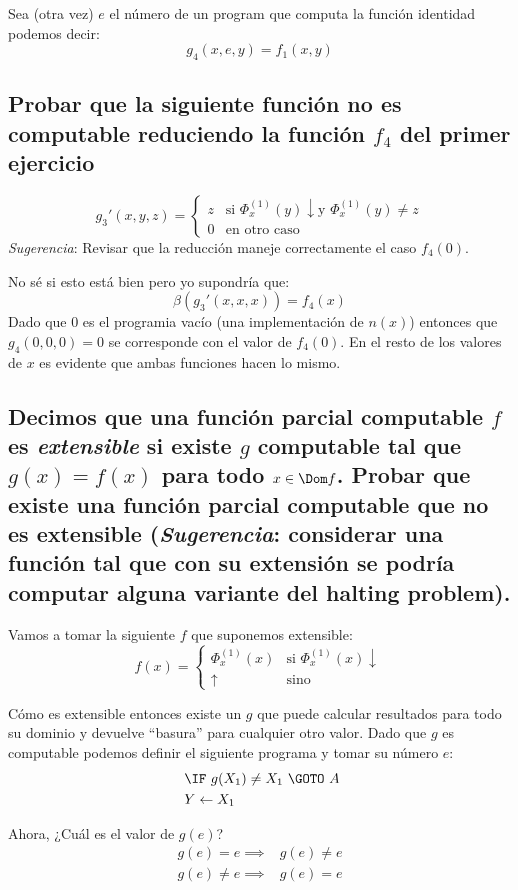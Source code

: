 \documentclass[fleqn, 11pt]{article}
\newcommand{\indef}{\uparrow}
\newcommand{\ddef}{\downarrow}
\newcommand{\into}{\leftarrow}
\begin{document}
Sea (otra vez) $e$ el número de un program que computa la función identidad
podemos decir:
\[
	g_4(x, e, y) = f_1(x, y)
\]

\subsection{Probar que la siguiente función no es computable reduciendo la
función $f_4$ del primer ejercicio}

\[
	g_3'(x, y, z) =
	\begin{cases}
		z & \text{si } \Phi^{(1)}_x(y) \ddef \text{y }
		    \Phi^{(1)}_x(y) \neq z \\
		0 & \text{en otro caso}
	\end{cases}
\]
\emph{Sugerencia}: Revisar que la reducción maneje correctamente el caso
$f_4(0)$.

No sé si esto está bien pero yo supondría que:
\[
	\beta(g_3'(x, x, x)) = f_4(x)
\] 
Dado que $0$ es el programia vacío (una implementación de $n(x)$) entonces que
$g_4(0, 0, 0) = 0$ se corresponde con el valor de $f_4(0)$. En el resto de los
valores de $x$ es evidente que ambas funciones hacen lo mismo.

\subsection{Decimos que una función parcial computable $f$ es \emph{extensible}
si existe $g$ computable tal que $g(x) = f(x)$ para todo $x \in \Dom f$. Probar
que existe una función parcial computable que no es extensible
(\emph{Sugerencia}: considerar una función tal que con su extensión se podría
computar alguna variante del halting problem).}

Vamos a tomar la siguiente $f$ que suponemos extensible:
\[
	f(x) =
	\begin{cases}
		\Phi^{(1)}_x(x) & \text{si } \Phi^{(1)}_x(x) \ddef \\
		\indef & \text{sino}
	\end{cases}
\]

Cómo es extensible entonces existe un $g$ que puede calcular resultados para
todo su dominio y devuelve ``basura'' para cualquier otro valor. Dado que $g$
es computable podemos definir el siguiente programa y tomar su número $e$:
\begin{align*}
	[A]\ &\IF\ g(X_1) \neq X_1\ \GOTO\ A \\
	     &Y \into X_1
\end{align*}

Ahora, ¿Cuál es el valor de $g(e)$?
\begin{align*}
	g(e) = e    \implies& g(e) \neq e \\
	g(e) \neq e \implies& g(e) = e
\end{align*}
\end{document}
